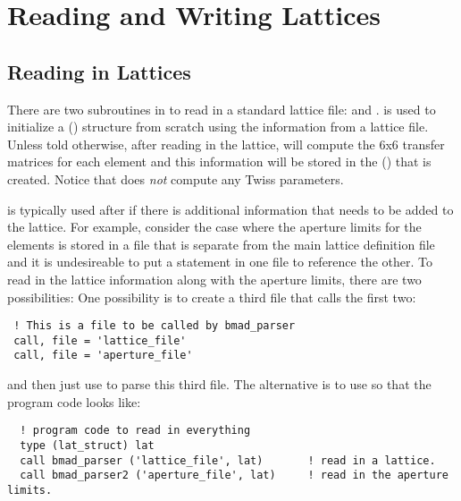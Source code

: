 \chapter{Reading and Writing Lattices}

\section{Reading in Lattices}
\label{s:lat.readin}

There are two subroutines in \bmad to read in a \bmad standard lattice file:
 and . 
is used to initialize a  () structure from scratch using the
information from a lattice file. Unless told otherwise, after reading in the lattice,
 will compute the 6x6 transfer matrices for each element and this information will
be stored in the  () that is created.  Notice that
 does {\em not} compute any Twiss parameters.

 is typically used after  if there is
additional information that needs to be added to the lattice. For example, consider the case where
the aperture limits for the elements is stored in a file that is separate from the main lattice
definition file and it is undesireable to put a  statement in one file to reference the
other.  To read in the lattice information along with the aperture limits, there are two
possibilities: One possibility is to create a third file that calls the first two:
\begin{verbatim}
 ! This is a file to be called by bmad_parser
 call, file = 'lattice_file'
 call, file = 'aperture_file'
\end{verbatim}
and then just use  to parse this third file. The
alternative is to use  so that the program code looks
like:
\begin{verbatim}
  ! program code to read in everything
  type (lat_struct) lat
  call bmad_parser ('lattice_file', lat)       ! read in a lattice.
  call bmad_parser2 ('aperture_file', lat)     ! read in the aperture limits.
\end{verbatim}

